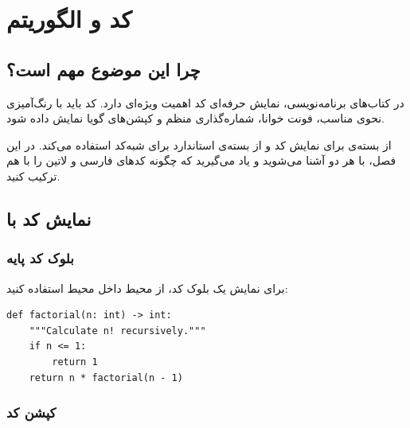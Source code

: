 
\chapter{کد و الگوریتم}
\label{chap:code}

\section{چرا این موضوع مهم است؟}
\label{sec:code-why}

در کتاب‌های برنامه‌نویسی، نمایش حرفه‌ای کد
اهمیت ویژه‌ای دارد. کد باید با رنگ‌آمیزی نحوی
مناسب، فونت خوانا، شماره‌گذاری منظم و کپشن‌های
گویا نمایش داده شود.

 از بسته‌ی  برای نمایش
کد و از بسته‌ی استاندارد  برای
شبه‌کد استفاده می‌کند. در این فصل، با هر دو
آشنا می‌شوید و یاد می‌گیرید که چگونه کدهای
فارسی و لاتین را با هم ترکیب کنید.


\section{نمایش کد با }
\label{sec:code-minted}

\subsection{بلوک کد پایه}
\label{sec:code-basic}

برای نمایش یک بلوک کد، از محیط 
داخل محیط  استفاده کنید:

\begin{latin}
\begin{verbatim}
def factorial(n: int) -> int:
    """Calculate n! recursively."""
    if n <= 1:
        return 1
    return n * factorial(n - 1)
\end{verbatim}
\end{latin}
\label{code:factorial}


\subsection{کپشن کد}
\label{sec:code-caption}

